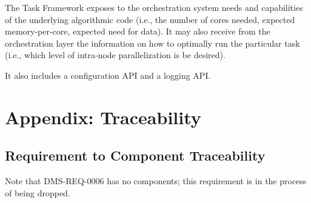 \documentclass[DM,lsstdraft,toc]{lsstdoc}
\begin{document}
The Task Framework exposes to the orchestration system needs and
capabilities of the underlying algorithmic code (i.e., the number of
cores needed, expected memory-per-core, expected need for data). It may
also receive from the orchestration layer the information on how to
optimally run the particular task (i.e., which level of intra-node
parallelization is be desired).

It also includes a configuration API and a logging API.
\newpage
\section{Appendix: Traceability}\label{appendix-traceability}

\subsection{Requirement to Component
Traceability}\label{requirement-to-component-traceability}

Note that DMS-REQ-0006 has no components; this requirement is in the
process of being dropped.
\end{document}
